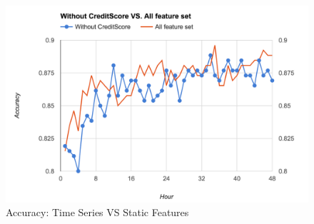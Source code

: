  \begin{figure}[!h]
\centering
\includegraphics[width=\columnwidth]{images/WCVSAF.png}
\caption{Accuracy: Time Series VS Static Features}
\label{fig:WCVSAF}
\end{figure}

  \begin{table}[!h]
 \centering
{}
\caption{Ranks of CreditScore}
\label{tab:Rank_Credit}
\end{table}
  
  \begin{table}[!h]
\centering
{}
 \caption{Rank of Part of CreditScore and CrowdWisdom}
\label{SPikemfeaturerank2}

 \end{table}
 
